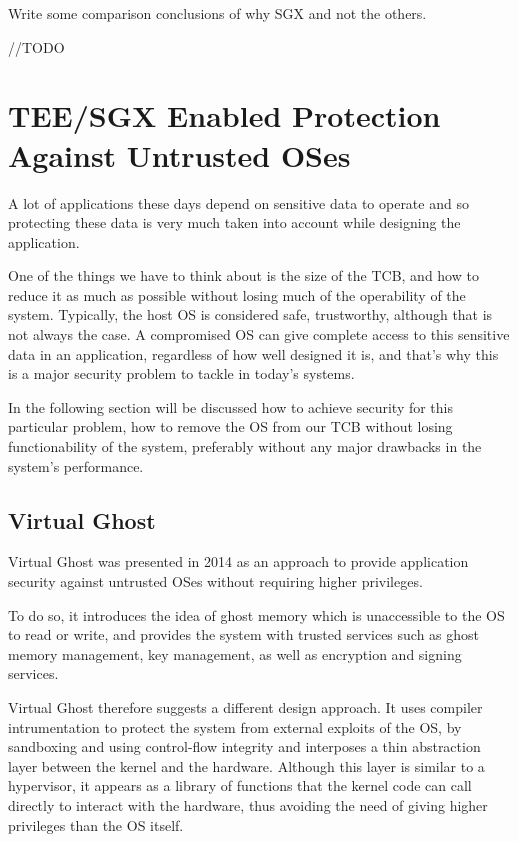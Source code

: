 Write some comparison conclusions of why SGX and not the others.

//TODO



\section{TEE/SGX Enabled Protection Against Untrusted OSes} %
\label{sec:folder_structure}

A lot of applications these days depend on sensitive data to operate and so protecting these data is very much taken into account while designing the application. 

One of the things we have to think about is the size of the TCB, and how to reduce it as much as possible without losing much of the operability of the system. Typically, the host OS is considered safe, trustworthy, although that is not always the case. A compromised OS can give complete access to this sensitive data in an application, regardless of how well designed it is, and that's why this is a major security problem to tackle in today's systems. 

In the following section will be discussed how to achieve security for this particular problem, how to remove the OS from our TCB without losing functionability of the system, preferably without any major drawbacks in the system's performance.

\subsection{Virtual Ghost}

Virtual Ghost was presented in 2014 \cite{virtGhostPaper} as an approach to provide application security against untrusted OSes without requiring higher privileges. 

To do so, it introduces the idea of ghost memory which is unaccessible to the OS to read or write, and provides the system with trusted services such as ghost memory management, key management, as well as encryption and signing services. 

Virtual Ghost therefore suggests a different design approach.
It uses compiler intrumentation to protect the system from external exploits of the OS, by sandboxing and using control-flow integrity and interposes a thin abstraction layer between the kernel and the hardware. Although this layer is similar to a hypervisor, it appears as a library of functions that the kernel code can call directly to interact with the hardware, thus avoiding the need of giving higher privileges than the OS itself. 

